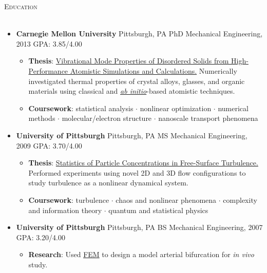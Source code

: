 \documentclass{article}
\newcommand{\area}[2]{\vspace*{-9pt} \begin{verse}\textbf{#1}   #2 \end{verse}  }
\newcommand{\lineunder}{\vspace*{-8pt} \\ \hspace*{-18pt} \hrulefill \\}
\newcommand{\header}[1]{{\hspace*{-15pt}\vspace*{6pt} \textsc{#1}} \vspace*{-6pt} \lineunder}
\newcommand{\schoolwithcourses}[3]{
 \textbf{#1} #2 $\bullet$ #3\\ 
\vspace*{5pt}
}
\begin{document}
\header{Education}

\begin{itemize}[leftmargin=*]
  \item \textbf{Carnegie Mellon University} Pittsburgh, PA PhD Mechanical Engineering, 2013 GPA: 3.85/4.00
  \begin{itemize}
    \item \textbf{Thesis}: \href{http://jasonlarkin.github.io/projects-phd.html}
    {Vibrational Mode Properties of Disordered Solids from High-Performance Atomistic Simulations and Calculations.}
Numerically investigated thermal properties of crystal alloys, glasses, and organic materials using classical and \href{http://en.wikipedia.org/wiki/Ab_initio_quantum_chemistry_methods}{\emph{ab initio}}-based atomistic techniques.
    \item \textbf{Coursework}: statistical analysis $\cdot$ nonlinear optimization $\cdot$ numerical methods $\cdot$ molecular/electron structure $\cdot$ nanoscale transport phenomena  
  \end{itemize}

  \item \textbf{University of Pittsburgh} Pittsburgh, PA MS Mechanical Engineering, 2009 GPA: 3.70/4.00
  \begin{itemize}
    \item \textbf{Thesis}: \href{http://jasonlarkin.github.io/projects-ms.html}{Statistics of Particle Concentrations in Free-Surface Turbulence.} Performed experiments using novel 2D and 3D flow configurations to study turbulence as a nonlinear dynamical system.

    \item \textbf{Coursework}: turbulence $\cdot$ chaos and nonlinear phenomena $\cdot$ complexity and information theory $\cdot$ quantum and statistical physics 
  \end{itemize}

  \item \textbf{University of Pittsburgh} Pittsburgh, PA BS Mechanical Engineering, 2007 GPA: 3.20/4.00
  \begin{itemize}
    \item \textbf{Research}: Used \href{http://en.wikipedia.org/wiki/Finite_element_method}{FEM} to design a model arterial bifurcation for \emph{in vivo} study.
  \end{itemize}


\end{itemize}
\end{document}
